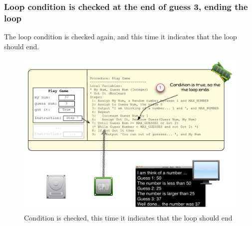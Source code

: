 
\clearpage
\subsubsection{Loop condition is checked at the end of guess 3, ending the loop} %
\label{ssub:loop_condition_is_checked_at_the_end_of_guess_3}

The loop condition is checked again, and this time it indicates that the loop should end.

\begin{figure}[htbp]
   \centering
   \includegraphics[width=\textwidth]{./topics/control-flow/images/PlayGame9} 
   \caption{Condition is checked, this time it indicates that the loop should end}
   \label{fig:play-game-9}
\end{figure}

